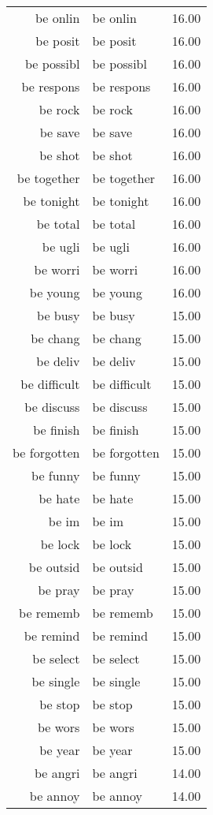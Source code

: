 \begin{table}[ht]
\begin{tabular}{rlr}
  be onlin & be onlin & 16.00 \\ 
  be posit & be posit & 16.00 \\ 
  be possibl & be possibl & 16.00 \\ 
  be respons & be respons & 16.00 \\ 
  be rock & be rock & 16.00 \\ 
  be save & be save & 16.00 \\ 
  be shot & be shot & 16.00 \\ 
  be together & be together & 16.00 \\ 
  be tonight & be tonight & 16.00 \\ 
  be total & be total & 16.00 \\ 
  be ugli & be ugli & 16.00 \\ 
  be worri & be worri & 16.00 \\ 
  be young & be young & 16.00 \\ 
  be busy & be busy & 15.00 \\ 
  be chang & be chang & 15.00 \\ 
  be deliv & be deliv & 15.00 \\ 
  be difficult & be difficult & 15.00 \\ 
  be discuss & be discuss & 15.00 \\ 
  be finish & be finish & 15.00 \\ 
  be forgotten & be forgotten & 15.00 \\ 
  be funny & be funny & 15.00 \\ 
  be hate & be hate & 15.00 \\ 
  be im & be im & 15.00 \\ 
  be lock & be lock & 15.00 \\ 
  be outsid & be outsid & 15.00 \\ 
  be pray & be pray & 15.00 \\ 
  be rememb & be rememb & 15.00 \\ 
  be remind & be remind & 15.00 \\ 
  be select & be select & 15.00 \\ 
  be single & be single & 15.00 \\ 
  be stop & be stop & 15.00 \\ 
  be wors & be wors & 15.00 \\ 
  be year & be year & 15.00 \\ 
  be angri & be angri & 14.00 \\ 
  be annoy & be annoy & 14.00 \\ 

\end{tabular}
\end{table}
